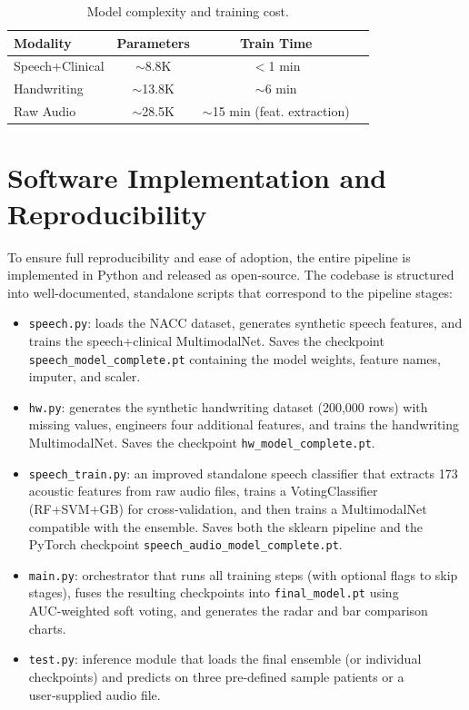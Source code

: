 \documentclass[conference]{IEEEtran}
\begin{document}
\begin{table}[htbp]
\centering
\caption{Model complexity and training cost.}
\label{tab:cost}
\begin{tabular}{@{}lccc@{}}
\toprule
\textbf{Modality} & \textbf{Parameters} & \textbf{Train Time} \\
\midrule
Speech+Clinical & $\sim$8.8K & $<$1 min \\
Handwriting     & $\sim$13.8K & $\sim$6 min \\
Raw Audio       & $\sim$28.5K & $\sim$15 min (feat. extraction) \\
\bottomrule
\end{tabular}
\end{table}

\section{Software Implementation and Reproducibility}
To ensure full reproducibility and ease of adoption, the entire pipeline is implemented in Python and released as open‑source. The codebase is structured into well‑documented, standalone scripts that correspond to the pipeline stages:

\begin{itemize}[leftmargin=*, nosep]
  \item \texttt{speech.py}: loads the NACC dataset, generates synthetic speech features, and trains the speech+clinical MultimodalNet. Saves the checkpoint \texttt{speech\_model\_complete.pt} containing the model weights, feature names, imputer, and scaler.
  \item \texttt{hw.py}: generates the synthetic handwriting dataset (200,000 rows) with missing values, engineers four additional features, and trains the handwriting MultimodalNet. Saves the checkpoint \texttt{hw\_model\_complete.pt}.
  \item \texttt{speech\_train.py}: an improved standalone speech classifier that extracts 173 acoustic features from raw audio files, trains a VotingClassifier (RF+SVM+GB) for cross‑validation, and then trains a MultimodalNet compatible with the ensemble. Saves both the sklearn pipeline and the PyTorch checkpoint \texttt{speech\_audio\_model\_complete.pt}.
  \item \texttt{main.py}: orchestrator that runs all training steps (with optional flags to skip stages), fuses the resulting checkpoints into \texttt{final\_model.pt} using AUC‑weighted soft voting, and generates the radar and bar comparison charts.
  \item \texttt{test.py}: inference module that loads the final ensemble (or individual checkpoints) and predicts on three pre‑defined sample patients or a user‑supplied audio file.
\end{itemize}
\end{document}
